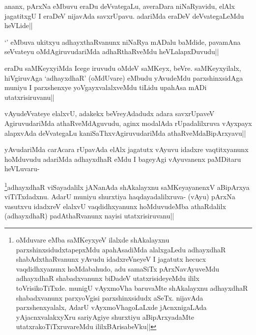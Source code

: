 
\begin{artha}
ananx, pArxNa eMbuvu eraDu deVvategaLu, averaDara niNaRyavidu, elAlx jagatitxgU I eraDeV nijavAda savxrUpavu. adariMda eraDeV deVvategaLeMdu heVLide||
\end{artha}

\begin{artha}%
`\stext ' eMbuva ukitxyu adhayxthaRvanunx niNaRya mADalu baMdide, pavamAna seVvateyu oMdAgiruvudariMda adhaRthaRveMdu heVLalapxDuvudu||
\end{artha}

\stext

\begin{artha}
eraDu saMKeyxyiMda Icege iruvudu oMdeV saMKeyx, beVre. saMKeyxyilalx, hiVgiruvAga `adhayxdhaR' (oMdUvare) eMbudu yAvudeMdu parxshinxsidAga muniyu I parxshenxye yoVgayxvalalxveMdu tiLidu upahAsa mADi utatxrisiruvanu||
\end{artha}

\begin{artha}
vAyudeVvateye elalxvU, adakekx beVreyAdadudx adara savxrUpaveV AgiruvudariMda athaRveMdAguvudu, aginx modalAda rUpadalilxruva vAyxpayx alapxvAda deVvategaLu kaniSaThxvAgiruvudariMda athaRveMdaBipArxyavu||
\end{artha}


\begin{artha}
yAvudariMda carAcara rUpavAda elAlx jagatutx vAyuvu idadxre vaqtitxyanunx hoMduvudu adariMda adhayxdhaR eMdu I bageyAgi vAyuvanenx paMDitaru heVLuvaru-
\end{artha}

\begin{artha}
\footnote[1]{oMduvare eMba saMKeyxyeV ilalxde shAkalayxnu parxshinxsidudxtapepxMdu apahAsadiMda alalxgaLedu adhayxdhaR shabAdxthaRvanunx yAvudu idadxreVneyeV I jagatutx hecucx vaqdidhxyanunx hoMdabahudo, adu samaSiTx pArxNavAyuveMdu adhayxdhaR shabadxvanunx biDadeV utatxrisideyeMdu ililx toVrisikoTiTxde. munigU vAyxmoVha baruvaMte shAkalayxnu adhayxdhaR shabadxvanunx parxyoVgisi  parxshinxsidudx aSeTx. nijavAda parxshenxyalalx, AdarU vAyxmoVhagoLaLxde jAcnxnigaLAda yAjacnxvalakxyXru sariyAgiye shurxtiyu aBipArxyadaMte utatxrakoTiTxruvareMdu ililxBArisabeVku||}adhayxdhaR viSayadalilx jANanAda shAkalayxnu saMKeyayanenxV aBipArxya viTiTxdadxnu. AdarU muniyu shurxtiya haqdayadalilxruva- (vAyu) pArxNa vasutxvu idadxreV elalxvU vaqdidhxyanunx hoMduvudeMba athaRdalilx (adhayxdhaR) padAthaRvanunx nayisi utatxrisiruvanu||
\end{artha}

